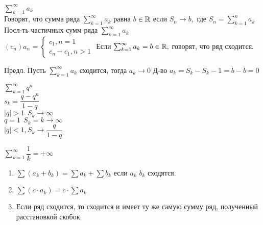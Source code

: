 \begin{definition}
	$ \sum_{k=1}^{\infty} a_k $\\
	Говорят, что сумма ряда $  \sum_{k=1}^{\infty} a_k $ равна  $ b \in \mathbb{R} $ если $ S_n \rightarrow b, $ где $ S_n =  \sum_{k=1}^{n} a_k$
	Посл-ть частичных сумм ряда $  \sum_{k=1}^{\infty} a_k$ \\
	$ (c_n) a_n = \left\{ \begin{matrix}
		c_1, n = 1 \\
		c_n - c_1, n > 1 
	\end{matrix} \right. $ 
	Если $  \sum_{k=1}^{\infty} a_k = b \in \mathbb{R}, $ говорят, что ряд сходится.
\end{definition}
Предл. Пусть $  \sum_{k=1}^{\infty} a_k $ сходится, тогда $ a_k \rightarrow 0 $ 
Д-во $ a_k = S_k - S_k-1 = b - b = 0$\\
\begin{example}
	 $ \sum_{k=1}^{\infty} q^n $\\
	 $ s_k = \dfrac{q - q^n}{1 - q} $ \\
	 $ |q | > 1\ \ S_k \rightarrow \infty $ \\
	 $ q = 1 \ \ S_k = k \rightarrow \infty $ \\
	 $ | q | < 1, S_k \rightarrow \dfrac{q}{1- q} $ \\
\end{example}
\begin{example}
	$  \sum_{k=1}^{\infty} \dfrac{1}{k} = +\infty $ \\
\end{example}
\begin{properties}
	\begin{enumerate}
		\item $ \sum(a_k + b_k) = \sum a_k + \sum b_k $ если $a_k $ $ b_k $ сходятся.
		\item $ \sum (c \cdot a_k ) = c \cdot \sum a_k $ 
		\item Если ряд сходится, то сходится и имеет ту же самую сумму ряд, полученный расстановкой скобок.
	\end{enumerate}
\end{properties}
